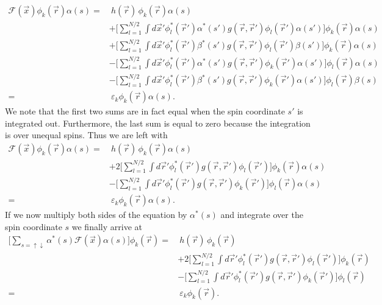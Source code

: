 \begin{equation}
\begin{split}
 \mathcal{F}(\vec x)\phi_k(\vec r)\alpha(s)  = &\ h(\vec r)\,\phi_k(\vec r)\alpha(s) \\
                      &  + \Big[\sum_{l=1}^{N/2}\int d\vec x'\phi^*_l(\vec r')\alpha^*(s')g(\vec r, \vec r')\phi_l(\vec r')\alpha(s')\Big]\phi_k(\vec r)\alpha(s) \\
                      &  + \Big[\sum_{l=1}^{N/2}\int d\vec x'\phi^*_l(\vec r')\beta^*(s')g(\vec r, \vec r')\phi_l(\vec r')\beta(s')\Big]\phi_k(\vec r)\alpha(s) \\
                       & - \Big[\sum_{l=1}^{N/2}\int d\vec x'\phi^*_l(\vec r')\alpha^*(s')g(\vec r, \vec r')\phi_k(\vec r')\alpha(s')\Big]\phi_l(\vec r)\alpha(s) \\
                       & - \Big[\sum_{l=1}^{N/2}\int d\vec x'\phi^*_l(\vec r')\beta^*(s')g(\vec r, \vec r')\phi_k(\vec r')\alpha(s')\Big]\phi_l(\vec r)\beta(s) \\
                     = &\ \varepsilon_k\phi_k(\vec r)\alpha(s).
\end{split}
\end{equation}
We note that the first two sums are in fact equal when the spin coordinate $s'$ is integrated out. Furthermore, the last sum is equal to zero because the integration
is over unequal spins. Thus we are left with
\begin{equation}
\begin{split}
 \mathcal{F}(\vec x)\phi_k(\vec r)\alpha(s)  = &\ h(\vec r)\,\phi_k(\vec r)\alpha(s) \\
                      &  + 2\Big[\sum_{l=1}^{N/2}\int d\vec r'\phi^*_l(\vec r')g(\vec r, \vec r')\phi_l(\vec r')\Big]\phi_k(\vec r)\alpha(s) \\
                       & - \Big[\sum_{l=1}^{N/2}\int d\vec r'\phi^*_l(\vec r')g(\vec r, \vec r')\phi_k(\vec r')\Big]\phi_l(\vec r)\alpha(s) \\
                       = &\ \varepsilon_k\phi_k(\vec r)\alpha(s).
\end{split}
\end{equation}
If we now multiply both sides of the equation by $\alpha^*(s)$ and integrate over the spin coordinate $s$ we finally arrive at
\begin{equation}
\begin{split}
 \big[\sum_{s=\uparrow\downarrow}\alpha^*(s)\mathcal F(\vec x)\alpha(s)\Big]\phi_k(\vec r) = &\ h(\vec r)\,\phi_k(\vec r) \\
                       & + 2\Big[\sum_{l=1}^{N/2}\int d\vec r'\phi^*_l(\vec r')g(\vec r, \vec r')\phi_l(\vec r')\Big]\phi_k(\vec r) \\
                       & - \Big[\sum_{l=1}^{N/2}\int d\vec r'\phi^*_l(\vec r')g(\vec r, \vec r')\phi_k(\vec r')\Big]\phi_l(\vec r) \\
                     = &\ \varepsilon_k\phi_k(\vec r).
\end{split}
\end{equation}
